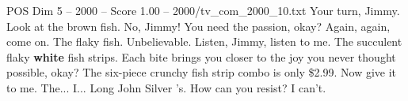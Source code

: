 \begin{textsample}{POS Dim 5 – 2000 – Score 1.00 – 2000/tv\_com\_2000\_10.txt}  \label{ex:f5_pos_066}
Your turn, Jimmy.
Look at the brown fish.
No, Jimmy!
You need the passion, okay?
Again, again, come on.
The flaky fish.
Unbelievable.
Listen, Jimmy, listen to me.
The succulent flaky \textbf{white} fish strips.
Each bite brings you closer to the joy you never thought possible, okay?
The six-piece crunchy fish strip combo is only \$2.99.
Now give it to me.
The...
I...
Long John Silver 's.
How can you resist?
I can't.

\end{textsample}
